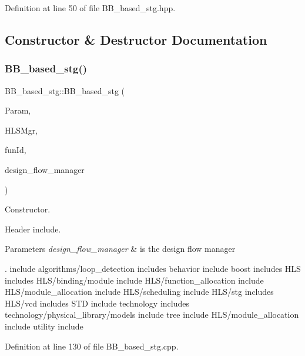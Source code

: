 Definition at line 50 of file B\+B\+\_\+based\+\_\+stg.\+hpp.



\subsection{Constructor \& Destructor Documentation}
\mbox{\label{classBB__based__stg_a27b4e9f2b0bf76564a5eafc1b72e69f1}} 
\subsubsection{\texorpdfstring{B\+B\+\_\+based\+\_\+stg()}{BB\_based\_stg()}}
{\footnotesize\ttfamily B\+B\+\_\+based\+\_\+stg\+::\+B\+B\+\_\+based\+\_\+stg (\begin{DoxyParamCaption}\item[{const \hyperlink{Parameter_8hpp_a37841774a6fcb479b597fdf8955eb4ea}{Parameter\+Const\+Ref}}]{Param,  }\item[{const \hyperlink{hls__manager_8hpp_acd3842b8589fe52c08fc0b2fcc813bfe}{H\+L\+S\+\_\+manager\+Ref}}]{H\+L\+S\+Mgr,  }\item[{unsigned int}]{fun\+Id,  }\item[{const Design\+Flow\+Manager\+Const\+Ref}]{design\+\_\+flow\+\_\+manager }\end{DoxyParamCaption})}



Constructor. 

Header include.


\begin{DoxyParams}{Parameters}
{\em design\+\_\+flow\+\_\+manager} & is the design flow manager\\
\hline
\end{DoxyParams}
. include algorithms/loop\+\_\+detection includes behavior include boost includes H\+LS includes H\+L\+S/binding/module include H\+L\+S/function\+\_\+allocation include H\+L\+S/module\+\_\+allocation include H\+L\+S/scheduling include H\+L\+S/stg includes H\+L\+S/vcd includes S\+TD include technology includes technology/physical\+\_\+library/models include tree include H\+L\+S/module\+\_\+allocation include utility include 

Definition at line 130 of file B\+B\+\_\+based\+\_\+stg.\+cpp.



